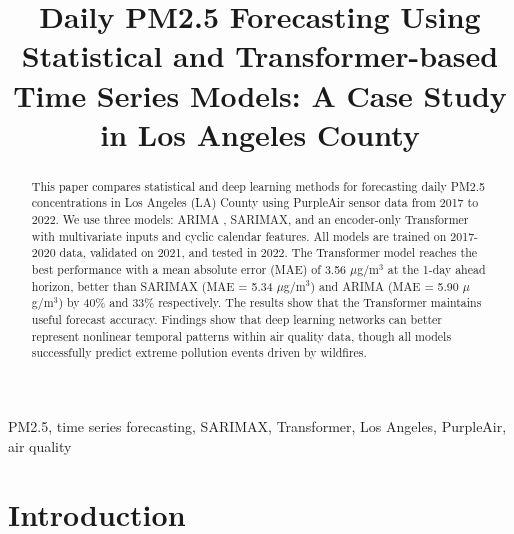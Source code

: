 \documentclass[conference]{IEEEtran}
\begin{document}
\title{Daily PM2.5 Forecasting Using Statistical and Transformer-based Time Series Models: A Case Study in Los Angeles County}

\author{
\and
{}
}

\maketitle

\begin{abstract}
This paper compares statistical and deep learning methods for forecasting daily PM2.5 concentrations in Los Angeles (LA) County using PurpleAir sensor data from 2017 to 2022. We use three models: ARIMA , SARIMAX, and an encoder-only Transformer with multivariate inputs and cyclic calendar features. All models are trained on 2017-2020 data, validated on 2021, and tested in 2022. The Transformer model reaches the best performance with a mean absolute error (MAE) of 3.56 $\mu$g/m$^3$ at the 1-day ahead horizon, better than SARIMAX (MAE = 5.34 $\mu$g/m$^3$) and ARIMA (MAE = 5.90 $\mu$g/m$^3$) by 40\% and 33\% respectively. The results show that the Transformer maintains useful forecast accuracy. Findings show that deep learning networks can better represent nonlinear temporal patterns within air quality data, though all models successfully predict extreme pollution events driven by wildfires.
\end{abstract}

\begin{IEEEkeywords}
PM2.5, time series forecasting, SARIMAX, Transformer, Los Angeles, PurpleAir, air quality
\end{IEEEkeywords}

\section{Introduction}
\end{document}
